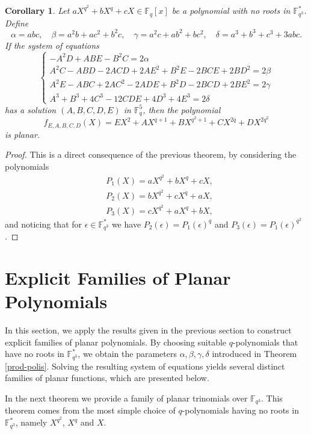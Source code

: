 \documentclass[12pt]{amsart}
\newtheorem{corollary}[theorem]{Corollary}
\begin{document}
	\begin{corollary}\label{cor1poli}
		Let $aX^{q^2} + bX^q + cX \in \mathbb{F}_q[x]$ be a polynomial with no roots in $\mathbb{F}_{q^3}^*$. Define
		$$\alpha = abc, \quad \beta = a^2b + ac^2 + b^2c, \quad \gamma = a^2c + ab^2 + bc^2, \quad \delta = a^3 + b^3 + c^3 + 3abc.$$
		If the system of equations
		\begin{equation*}
			\begin{cases}
				-A^2D + ABE - B^2C = 2\alpha \\
				A^2C - ABD - 2ACD + 2AE^2 + B^2E - 2BCE + 2BD^2 = 2\beta \\
				A^2E - ABC + 2AC^2 - 2ADE + B^2D - 2BCD + 2BE^2 = 2\gamma \\
				A^3 + B^3 + 4C^3 - 12CDE + 4D^3 + 4E^3 = 2\delta
			\end{cases}
		\end{equation*}
		has a solution $(A, B, C, D, E)$ in $\mathbb{F}_q^5$, then the polynomial
		$$f_{E,A,B,C,D}(X) = EX^2 + AX^{q+1}+ BX^{q^2+1}+CX^{2q} +DX^{2q^2}$$
		is planar.
	\end{corollary}
	\begin{proof}
		This is a direct consequence of the previous theorem, by considering the polynomials
		\begin{align*} 
			&P_1(X)=aX^{q^2} + bX^q + cX,\\ 
			&P_2(X)=bX^{q^2} + cX^q + aX, \\
			&P_3(X)=cX^{q^2} + aX^q + bX,
		\end{align*} 
		and noticing that for $\epsilon \in \mathbb{F}_{q^3}^\ast$ we have $P_2(\epsilon)=P_1(\epsilon)^q$ and $P_3(\epsilon)=P_1(\epsilon)^{q^2}$.
	\end{proof}

	\section{Explicit Families of Planar Polynomials}
	
	In this section, we apply the results given in the previous section to construct explicit families of planar polynomials. By choosing suitable $q$-polynomials that have no roots in $\mathbb{F}_{q^3}^*$, we obtain the parameters $\alpha, \beta, \gamma, \delta$ introduced in Theorem \ref{prod-polis}. Solving the resulting system of equations yields several distinct families of planar functions, which are presented below.
	
	In the next theorem we provide a family of  planar trinomials over $\mathbb{F}_{q^3}$. This theorem comes from the most simple choice of $q$-polynomials having no roots in $\mathbb{F}_{q^3}^*$, namely $X^{q^2}$, $X^q$ and $X$.
	
\end{document}
